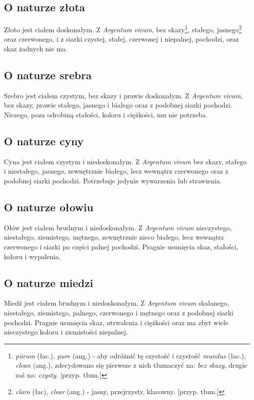 \subsection{O naturze złota}
Złoto jest ciałem doskonałym. Z \textit{Argentum vivum}, bez skazy\footnote{\textit{p\=urum} (łac.), \textit{pure} (ang.) - aby odróżnić tę czystość i czystość \textit{mundus} (łac.), \textit{clean} (ang.), zdecydowano się pierwsze z nich tłumaczyć na: \textit{bez skazy}, drugie zaś na: \textit{czysty}. [przyp. tłum.]}, stałego, jasnego\footnote{\textit{claro} (łac), \textit{clear} (ang.) - jasny, przejrzysty, klarowny. [przyp. tłum.]} oraz czerwonego, i z siarki czystej, stałej, czerwonej i niepalnej, pochodzi, oraz skaz żadnych nie ma.

\subsection{O naturze srebra}
Srebro jest ciałem czystym, bez skazy i prawie doskonałym. Z \textit{Argentum vivum}, bez skazy, prawie stałego, jasnego i białego oraz z podobnej siarki pochodzi. Niczego, poza odrobiną stałości, koloru i ciężkości, mu nie potrzeba.

\subsection{O naturze cyny}
Cyna jest ciałem czystym i niedoskonałym. Z \textit{Argentum vivum} bez skazy, stałego i niestałego, jasnego, zewnętrznie białego, lecz wewnątrz czerwonego oraz z podobnej siarki pochodzi. Potrzebuje jedynie wywarzenia lub strawienia.

\subsection{O naturze ołowiu}
Ołów jest ciałem brudnym i niedoskonałym. Z \textit{Argentum vivum} nieczystego, niestałego, ziemistego, mętnego, zewnętrznie nieco białego, lecz wewnątrz czerwonego i siarki po części palnej pochodzi. Pragnie usunięcia skaz, stałości, koloru i wypalenia.

\subsection{O naturze miedzi}
Miedź jest ciałem brudnym i niedoskonałym. Z \textit{Argentum vivum} skalanego, niestałego, ziemistego, palnego, czerwonego i mętnego oraz z podobnej siarki pochodzi. Pragnie usunięcia skaz, utrwalenia i ciężkości oraz ma zbyt wiele nieczystego  koloru i ziemistości niepalnej.

